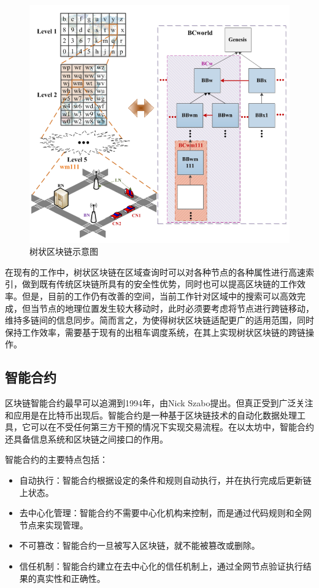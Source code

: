 \begin{figure}
	\centering
	\includegraphics[width=\textwidth]{figures/树状区块链示意图.png}
	\caption{树状区块链示意图}
	\label{fig:树状区块链示意图}
\end{figure}

在现有的工作中，树状区块链在区域查询时可以对各种节点的各种属性进行高速索引，做到既有传统区块链所具有的安全性优势，同时也可以提高区块链的工作效率。但是，目前的工作仍有改善的空间，当前工作针对区域中的搜索可以高效完成，但当节点的地理位置发生较大移动时，此时必须要考虑将节点进行跨链移动，维持多链间的信息同步。简而言之，为使得树状区块链适配更广的适用范围，同时保持工作效率，需要基于现有的出租车调度系统，在其上实现树状区块链的跨链操作。

\subsection{智能合约}

区块链智能合约最早可以追溯到1994年，由Nick Szabo提出\cite{szabo1997}。但真正受到广泛关注和应用是在比特币出现后。智能合约是一种基于区块链技术的自动化数据处理工具，它可以在不受任何第三方干预的情况下实现交易流程。在以太坊中，智能合约还具备信息系统和区块链之间接口的作用\cite{atzei2017}。

智能合约的主要特点包括：
\begin{itemize}
    \item 自动执行：智能合约根据设定的条件和规则自动执行，并在执行完成后更新链上状态。
    \item 去中心化管理：智能合约不需要中心化机构来控制，而是通过代码规则和全网节点来实现管理。
    \item 不可篡改：智能合约一旦被写入区块链，就不能被篡改或删除。
    \item 信任机制：智能合约建立在去中心化的信任机制上，通过全网节点验证执行结果的真实性和正确性\cite{xia2022}。
\end{itemize}

